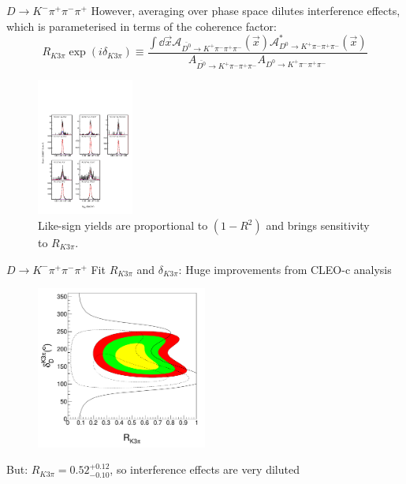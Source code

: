 \documentclass{beamer}
\begin{document}
\begin{frame}{$D\to K^-\pi^+\pi^-\pi^+$}
  \vspace{0.0cm}
  {\large However, averaging over phase space dilutes interference effects, which is parameterised in terms of the coherence factor:}
  \begin{equation*}
    R_{K3\pi}\exp(i\delta_{K3\pi})\equiv\frac{\int\dd{\vec{x}}\mathcal{A}_{\bar{D^0}\to K^+\pi^-\pi^+\pi^-}(\vec{x})\mathcal{A}^*_{D^0\to K^+\pi^-\pi^+\pi^-}(\vec{x})}{A_{\bar{D^0}\to K^+\pi^-\pi^+\pi^-}A_{D^0\to K^+\pi^-\pi^+\pi^-}}
  \end{equation*}
  \begin{figure}
    \includegraphics[height=4.5cm,trim={1.5cm 11.7cm 0 0},clip=true]{Figures/K3pi_Self_Tag.pdf}
    \caption*{Like-sign yields are proportional to $(1 - R^2)$ and brings sensitivity to $R_{K3\pi}$.}
  \end{figure}
\end{frame}

\begin{frame}{$D\to K^-\pi^+\pi^-\pi^+$}
  \vspace{0.0cm}
  {\large Fit $R_{K3\pi}$ and $\delta_{K3\pi}$: Huge improvements from CLEO-c analysis}
  \vspace{-0.2cm}
  \begin{figure}
    \includegraphics[width=0.5\textwidth]{Figures/K3pi_Global_Fit.pdf}
  \end{figure}
  \vspace{-0.5cm}
  {\large But: $R_{K3\pi} = 0.52^{+0.12}_{-0.10}$, so interference effects are very diluted}
\end{frame}
\end{document}
